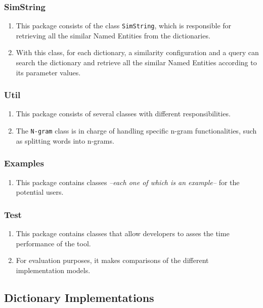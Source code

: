 \subsubsection*{SimString}
\begin{enumerate}[-]
	\item This package consists of the class \texttt{SimString}, which is responsible for retrieving all the similar Named Entities from the dictionaries. 
	\item With this class, for each dictionary, a similarity configuration and a query can search the dictionary and retrieve all the similar Named Entities according to its parameter values.
\end{enumerate}

\subsubsection*{Util}
\begin{enumerate}[-]
	\item This package consists of several classes with different responsibilities.
	\item The \texttt{N-gram} class is in charge of handling specific n-gram functionalities, such as splitting words into n-grams.
\end{enumerate}

\subsubsection*{Examples}
\begin{enumerate}[-]
	\item This package contains classes \textit{--each one of which is an example--} for the potential users.
\end{enumerate}

\subsubsection*{Test}
\begin{enumerate}[-]
	\item This package contains classes that allow developers to asses the time performance of the tool.
	\item For evaluation purposes, it makes comparisons of the different implementation models.
\end{enumerate}

\subsection{Dictionary Implementations}

